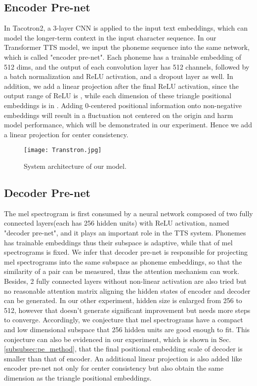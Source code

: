 \documentclass[letterpaper]{article} \usepackage{aaai19}  \usepackage{times}  \usepackage{helvet}  \usepackage{courier}  \usepackage{url}  \usepackage{graphicx}  \frenchspacing
\begin{document}
\subsection{Encoder Pre-net}
\label{subsec:enc_prenet}
In Tacotron2, a 3-layer CNN is applied to the input text embeddings, which can model the longer-term context in the input character sequence. In our Transformer TTS model, we input the phoneme sequence into the same network, which is called "encoder pre-net". Each phoneme has a trainable embedding of 512 dims, and the output of each convolution layer has 512 channels, followed by a batch normalization and ReLU activation, and a dropout layer as well. In addition, we add a linear projection after the final ReLU activation, since the output range of ReLU is , while each dimension of these triangle positional embeddings is in . Adding 0-centered positional information onto non-negative embeddings will result in a fluctuation not centered on the origin and harm model performance, which will be demonstrated in our experiment. Hence we add a linear projection for center consistency.

\begin{figure}[!htb]
  \centering
  \texttt{[image: Transtron.jpg]}
  \caption{System architecture of our model.}
  \label{fig:transtron}
\end{figure}

\subsection{Decoder Pre-net}
\label{subsec:dec_prenet}
The mel spectrogram is first consumed by a neural network composed of two fully connected layers(each has 256 hidden units) with ReLU activation, named "decoder pre-net", and it plays an important role in the TTS system.
Phonemes has trainable embeddings thus their subspace is adaptive, while that of mel spectrograms is fixed. We infer that decoder pre-net is responsible for projecting mel spectrograms into the same subspace as phoneme embeddings, so that the similarity of a  pair can be measured, thus the attention mechanism can work. Besides, 2 fully connected layers without non-linear activation are also tried but no reasonable attention matrix aligning the hidden states of encoder and decoder can be generated. In our other experiment, hidden size is enlarged from 256 to 512, however that doesn't generate significant improvement but needs more steps to converge. Accordingly, we conjecture that mel spectrograms have a compact and low dimensional subspace that 256 hidden units are good enough to fit. This conjecture can also be evidenced in our experiment, which is shown in Sec. \ref{subsubsec:pe_method}, that the final positional embedding scale of decoder is smaller than that of encoder. An additional linear projection is also added like encoder pre-net not only for center consistency but also obtain the same dimension as the triangle positional embeddings.
\end{document}
